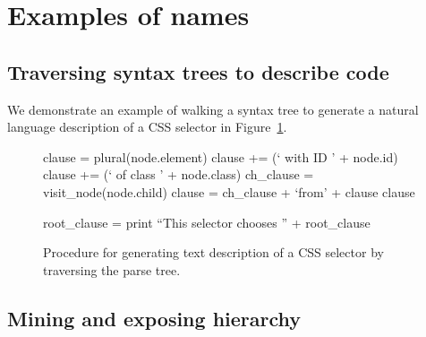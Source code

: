 \section{Examples of \Glspl{name}}

\subsection{Traversing syntax trees to describe code}

We demonstrate an example of walking a syntax tree to generate a natural language description of a CSS selector in Figure~\ref{alg:css_traversal}.

\begin{figure}
\begin{algorithmic}

    \State clause = plural(node.element)
        \State clause += (` with ID ' + node.id)
        \State clause += (` of class ' + node.class)
    \EndIf
        \State ch\_clause = visit\_node(node.child)
        \State clause = ch\_clause + `from' + clause
    \EndIf
    \State \Return clause
\EndFunction

\State
{}
    \State root\_clause = 
    \State print ``This selector chooses '' + root\_clause
\EndFunction

\end{algorithmic}
\label{alg:css_traversal}
\caption{Procedure for generating text description of a CSS selector by traversing the parse tree.
}
\end{figure}

\subsection{Mining and exposing hierarchy}

\begin{figure}
\end{figure}

